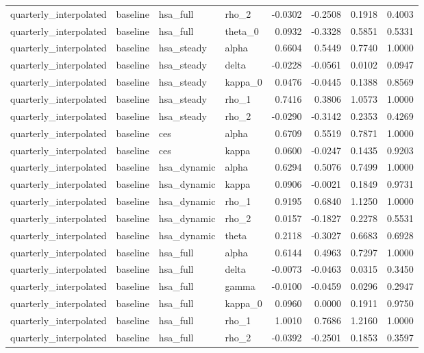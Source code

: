 \begin{tabular}{llllrrrr}
quarterly\_interpolated & baseline & hsa\_full & rho\_2 & -0.0302 & -0.2508 & 0.1918 & 0.4003 \\
quarterly\_interpolated & baseline & hsa\_full & theta\_0 & 0.0932 & -0.3328 & 0.5851 & 0.5331 \\
quarterly\_interpolated & baseline & hsa\_steady & alpha & 0.6604 & 0.5449 & 0.7740 & 1.0000 \\
quarterly\_interpolated & baseline & hsa\_steady & delta & -0.0228 & -0.0561 & 0.0102 & 0.0947 \\
quarterly\_interpolated & baseline & hsa\_steady & kappa\_0 & 0.0476 & -0.0445 & 0.1388 & 0.8569 \\
quarterly\_interpolated & baseline & hsa\_steady & rho\_1 & 0.7416 & 0.3806 & 1.0573 & 1.0000 \\
quarterly\_interpolated & baseline & hsa\_steady & rho\_2 & -0.0290 & -0.3142 & 0.2353 & 0.4269 \\
quarterly\_interpolated & baseline & ces & alpha & 0.6709 & 0.5519 & 0.7871 & 1.0000 \\
quarterly\_interpolated & baseline & ces & kappa & 0.0600 & -0.0247 & 0.1435 & 0.9203 \\
quarterly\_interpolated & baseline & hsa\_dynamic & alpha & 0.6294 & 0.5076 & 0.7499 & 1.0000 \\
quarterly\_interpolated & baseline & hsa\_dynamic & kappa & 0.0906 & -0.0021 & 0.1849 & 0.9731 \\
quarterly\_interpolated & baseline & hsa\_dynamic & rho\_1 & 0.9195 & 0.6840 & 1.1250 & 1.0000 \\
quarterly\_interpolated & baseline & hsa\_dynamic & rho\_2 & 0.0157 & -0.1827 & 0.2278 & 0.5531 \\
quarterly\_interpolated & baseline & hsa\_dynamic & theta & 0.2118 & -0.3027 & 0.6683 & 0.6928 \\
quarterly\_interpolated & baseline & hsa\_full & alpha & 0.6144 & 0.4963 & 0.7297 & 1.0000 \\
quarterly\_interpolated & baseline & hsa\_full & delta & -0.0073 & -0.0463 & 0.0315 & 0.3450 \\
quarterly\_interpolated & baseline & hsa\_full & gamma & -0.0100 & -0.0459 & 0.0296 & 0.2947 \\
quarterly\_interpolated & baseline & hsa\_full & kappa\_0 & 0.0960 & 0.0000 & 0.1911 & 0.9750 \\
quarterly\_interpolated & baseline & hsa\_full & rho\_1 & 1.0010 & 0.7686 & 1.2160 & 1.0000 \\
quarterly\_interpolated & baseline & hsa\_full & rho\_2 & -0.0392 & -0.2501 & 0.1853 & 0.3597 \\

\end{tabular}
